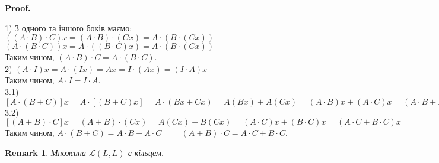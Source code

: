 \documentclass[a4paper, 10pt]{article}
\makeatletter
\theoremstyle{theoremdd}
\newtheorem{remark}[theorem]{Remark}
\renewenvironment{proof}[1][Proof.\\]{\par
\pushQED{\hfill \qed}%
\normalfont \topsep6\p@\@plus6\p@\relax
\trivlist
\item\relax
{\bfseries
#1\@addpunct{.}}\hspace\labelsep\ignorespaces
}{%
\popQED\endtrivlist\@endpefalse
}
\makeatother
\begin{document}
	\begin{proof}
	1) З одного та іншого боків маємо:\\
	$((A \cdot B) \cdot C) x = (A \cdot B) \cdot (Cx) = A \cdot (B \cdot (Cx))$\\
	$(A \cdot (B \cdot C)) x = A \cdot ( (B \cdot C) x) = A \cdot (B \cdot (Cx))$\\
	Таким чином, $(A \cdot B) \cdot C = A \cdot (B \cdot C)$.
	\bigskip \\
	2) $(A \cdot I) x = A \cdot (Ix) = A x = I \cdot (A x) = (I \cdot A) x$\\
	Таким чином, $A \cdot I = I \cdot A$.
	\bigskip \\
	3.1) $[A \cdot (B + C)]x = A \cdot [(B+C)x] = A \cdot (Bx + Cx) = A (Bx) + A (Cx) = (A \cdot B)x + (A \cdot C)x = (A \cdot B + A \cdot C)x$\\
	3.2) $[(A+B) \cdot C]x = (A+B) \cdot (Cx) = A (Cx) + B (Cx) = (A \cdot C)x + (B \cdot C)x = (A \cdot C + B \cdot C)x$\\
	Таким чином, $A \cdot (B+C) = A \cdot B + A \cdot C \hspace{1cm} (A+B) \cdot C = A \cdot C + B \cdot C$.
	\end{proof}
	
	\begin{remark}
	Множина $\mathcal{L}(L,L)$ є кільцем.
	\end{remark}
	
\end{document}
